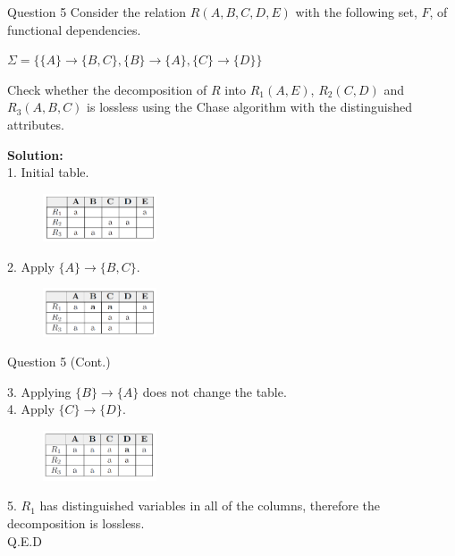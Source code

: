 \begin{frame}[fragile]{Question 5}
	Consider the relation $R(A,B,C,D,E)$ with the following set, $F$, of functional dependencies.\\ \vspace{5pt}
	
	$\Sigma=\{\{A\}\rightarrow\{B,C\}, \{B\}\rightarrow\{A\},\{C\}\rightarrow\{D\}\}$\\ \vspace{5pt}
	
	Check whether the decomposition of $R$ into $R_1(A,E)$, $R_2(C,D)$ and $R_3(A,B,C)$ is lossless using the Chase algorithm with the distinguished attributes.\\ \vspace{5pt}
	
	\textbf{Solution:}\\ \vspace{2pt}
	1. Initial table.\\
	\begin{figure}
		\includegraphics[width=0.3\textwidth, trim=0 0 0 0, clip]{4221-t5/images/5-1.png}
	\end{figure}
	
	2. Apply $\{A\} \rightarrow \{B,C\}$.\\
	\begin{figure}
		\includegraphics[width=0.3\textwidth, trim=0 0 0 0, clip]{4221-t5/images/5-2.png}
	\end{figure}
	
\end{frame}
\begin{frame}[fragile]{Question 5 (Cont.)}
	
	3. Applying $\{B\} \rightarrow \{A\}$ does not change the table.\\
	4. Apply $\{C\} \rightarrow \{D\}$.\\
	\begin{figure}
		\includegraphics[width=0.3\textwidth, trim=0 0 0 0, clip]{4221-t5/images/5-4.png}
	\end{figure}

	5. $R_1$ has distinguished variables in all of the columns, therefore the decomposition is lossless.\\
	\hfill Q.E.D
\end{frame}

